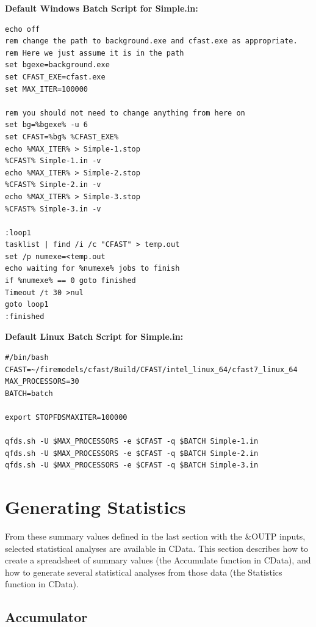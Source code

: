 \documentclass[12pt,twoside]{book}
\begin{document}
\vspace{\baselineskip}
\noindent \textbf{Default Windows Batch Script for Simple.in:}

\begin{lstlisting}[basicstyle=\scriptsize]
echo off
rem change the path to background.exe and cfast.exe as appropriate.
rem Here we just assume it is in the path
set bgexe=background.exe
set CFAST_EXE=cfast.exe
set MAX_ITER=100000

rem you should not need to change anything from here on
set bg=%bgexe% -u 6
set CFAST=%bg% %CFAST_EXE%
echo %MAX_ITER% > Simple-1.stop
%CFAST% Simple-1.in -v
echo %MAX_ITER% > Simple-2.stop
%CFAST% Simple-2.in -v
echo %MAX_ITER% > Simple-3.stop
%CFAST% Simple-3.in -v

:loop1
tasklist | find /i /c "CFAST" > temp.out
set /p numexe=<temp.out
echo waiting for %numexe% jobs to finish
if %numexe% == 0 goto finished
Timeout /t 30 >nul
goto loop1
:finished
\end{lstlisting}

\vspace{\baselineskip}
\noindent \textbf{Default Linux Batch Script for Simple.in:}

\begin{lstlisting}[basicstyle=\scriptsize]
#/bin/bash
CFAST=~/firemodels/cfast/Build/CFAST/intel_linux_64/cfast7_linux_64
MAX_PROCESSORS=30
BATCH=batch

export STOPFDSMAXITER=100000

qfds.sh -U $MAX_PROCESSORS -e $CFAST -q $BATCH Simple-1.in
qfds.sh -U $MAX_PROCESSORS -e $CFAST -q $BATCH Simple-2.in
qfds.sh -U $MAX_PROCESSORS -e $CFAST -q $BATCH Simple-3.in
\end{lstlisting}

\section{Generating Statistics}

From these summary values defined in the last section with the {\ct \&OUTP} inputs, selected statistical analyses are available in CData. This section describes how to create a spreadsheet of summary values (the Accumulate function in CData), and how to generate several statistical analyses from those data (the Statistics function in CData).

\subsection{Accumulator}
\end{document}
